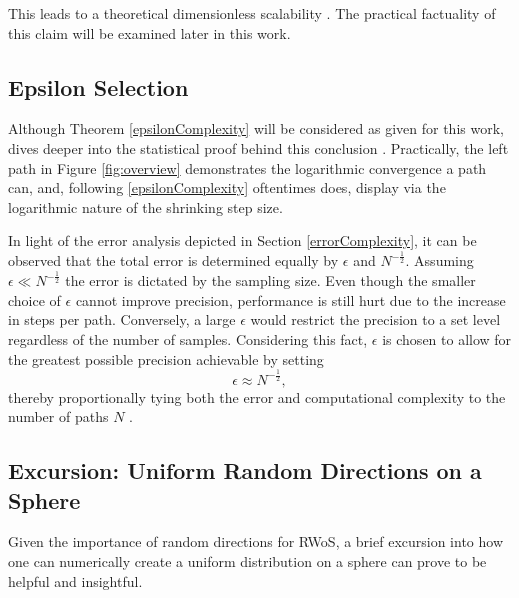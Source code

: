  This leads to a theoretical dimensionless scalability \cite{Bornemann}.  The practical factuality
 of this claim will be examined later in this work.

\subsection{Epsilon Selection}

Although Theorem \ref{epsilonComplexity} will be considered as given for this work,
dives deeper into the statistical proof behind this conclusion \cite{DeLaurentis}.  Practically, the
 left path in Figure \ref{fig:overview} demonstrates the logarithmic convergence a path
 can, and, following \ref{epsilonComplexity} oftentimes does, display via the logarithmic
 nature of the shrinking step size.

 In light of the error analysis depicted in Section \ref{errorComplexity}, it can be observed that the total error is
 determined equally by $\epsilon$ and $N^{-\frac{1}{2}}$. Assuming $ \epsilon \ll N^{-\frac{1}{2}} $ the error
 is dictated by the sampling size.  Even though the
 smaller choice of $\epsilon$ cannot improve precision, performance is still hurt
 due to the increase in steps per path. Conversely, a large $\epsilon$ would
 restrict the precision to a set level regardless of the number of samples.
 Considering this fact, $\epsilon$ is chosen to allow for
 the greatest possible precision achievable by setting
  $$\epsilon \approx N^{-\frac{1}{2}},$$\label{epsilonDefinition}
 thereby proportionally tying both the error and computational complexity to the
 number of paths $N$ \cite{Bornemann}.
\subsection{Excursion: Uniform Random Directions on a Sphere}\label{uniformPoints}
Given the importance of random directions for \Gls{RWoS}, a brief excursion
into how one can numerically create a uniform distribution on a sphere can prove
to be helpful and insightful.

